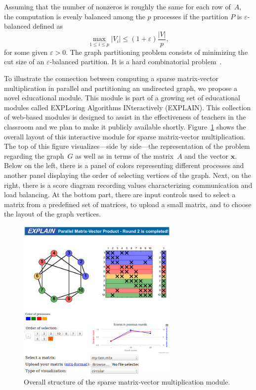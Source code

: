 \documentclass[11pt, twoside,a4paper]{book}
\newcommand{\mat}[1]{\ensuremath{#1}}
\newcommand{\vek}[1]{{\ensuremath{\mathbf #1}}}
\begin{document}
Assuming that the number of nonzeros is roughly the same for each row of~\mat{A}, the
computation is evenly balanced among the $p$ processes if the partition $P$ is
$\varepsilon$-balanced defined as
\begin{equation}\label{e.bal}
\max_{1 \leq i \leq p} |V_i| \leq (1 + \varepsilon) \frac{|V|}{p} ,
\end{equation}
for some given $\varepsilon > 0$. The graph partitioning problem consists of minimizing
the cut size of an $\varepsilon$-balanced partition. It is a hard combinatorial
problem~\cite{gj:com}.


To illustrate the connection between computing a sparse matrix-vector multiplication in
parallel and partitioning an undirected graph, we propose a novel educational module.
This module is part of a growing set of educational modules called EXPLoring Algorithms
INteractively (EXPLAIN). This collection of web-based modules is designed to assist in
the effectiveness of teachers in the classroom and we plan to make it publicly available
shortly. Figure~\ref{f.explain.matvec} shows the overall layout of this interactive
module for sparse matrix-vector multiplication. The top of this figure visualizes---side by side---the representation of the problem regarding the graph~$G$ as well as in terms
of the matrix~\mat{A} and the vector \vek{x}. Below on the left, there is a panel of
colors representing different processes and another panel displaying the order of
selecting vertices of the graph. Next, on the right, there is a score diagram recording
values characterizing communication and load balancing. At the bottom part, there are
input controls used to select a matrix from a predefined set of matrices, to upload a
small matrix, and to choose the layout of the graph vertices.


\begin{figure}
\centering
\includegraphics[width=0.7\textwidth]{final}
\caption{Overall structure of the sparse matrix-vector multiplication module.}
\label{f.explain.matvec}
\end{figure}
\end{document}
